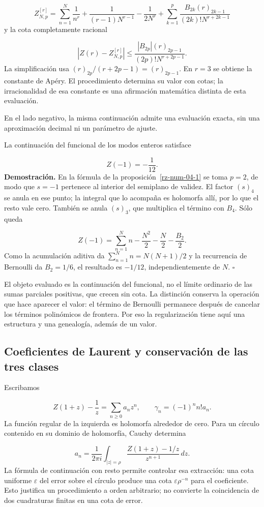 \[
Z_{N,p}^{[r]}=
\sum_{n=1}^N\frac1{n^r}+\frac1{(r-1)N^{r-1}}-\frac1{2N^r}
+\sum_{k=1}^p\frac{B_{2k}(r)_{2k-1}}{(2k)!N^{r+2k-1}}
\]
y la cota completamente racional

\[
\left|Z(r)-Z_{N,p}^{[r]}\right|
\leq\frac{|B_{2p}|(r)_{2p-1}}{(2p)!N^{r+2p-1}}.
\]
La simplificación usa \((r)_{2p}/(r+2p-1)=(r)_{2p-1}\). En \(r=3\) se obtiene la constante de Apéry. El procedimiento determina su valor con cotas; la irracionalidad de esa constante es una afirmación matemática distinta de esta evaluación.

En el lado negativo, la misma continuación admite una evaluación exacta, sin una aproximación decimal ni un parámetro de ajuste.

La continuación del funcional de los modos enteros satisface

\[
Z(-1)=-\frac1{12}.
\]
\textbf{Demostración.} En la fórmula de la proposición~\ref{rz-num-04-1} se toma \(p=2\), de modo que \(s=-1\) pertenece al interior del semiplano de validez. El factor \((s)_4\) se anula en ese punto; la integral que lo acompaña es holomorfa allí, por lo que el resto vale cero. También se anula \((s)_3\), que multiplica el término con \(B_4\). Sólo queda

\[
Z(-1)=\sum_{n=1}^N n-\frac{N^2}{2}-\frac N2-\frac{B_2}{2}.
\]
Como la acumulación aditiva da \(\sum_{n=1}^N n=N(N+1)/2\) y la recurrencia de Bernoulli da \(B_2=1/6\), el resultado es \(-1/12\), independientemente de \(N\). \hfill\(\square\)

El objeto evaluado es la continuación del funcional, no el límite ordinario de las sumas parciales positivas, que crecen sin cota. La distinción conserva la operación que hace aparecer el valor: el término de Bernoulli permanece después de cancelar los términos polinómicos de frontera. Por eso la regularización tiene aquí una estructura y una genealogía, además de un valor.

\subsection{Coeficientes de Laurent y conservación de las tres clases}
Escribamos

\[
Z(1+z)-\frac1z=\sum_{n\geq0}a_nz^n,
\qquad \gamma_n=(-1)^nn!a_n.
\]
La función regular de la izquierda es holomorfa alrededor de cero. Para un círculo contenido en su dominio de holomorfía, Cauchy determina

\[
a_n=\frac1{2\pi i}\int_{|z|=\rho}
\frac{Z(1+z)-1/z}{z^{n+1}}\,dz.
\]
La fórmula de continuación con resto permite controlar esa extracción: una cota uniforme \(\varepsilon\) del error sobre el círculo produce una cota \(\varepsilon\rho^{-n}\) para el coeficiente. Esto justifica un procedimiento a orden arbitrario; no convierte la coincidencia de dos cuadraturas finitas en una cota de error.

